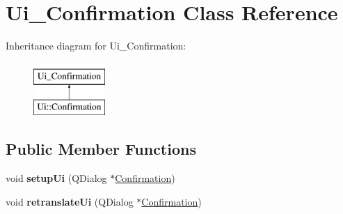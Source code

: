 \hypertarget{class_ui___confirmation}{\section{Ui\-\_\-\-Confirmation Class Reference}
\label{class_ui___confirmation}
}
Inheritance diagram for Ui\-\_\-\-Confirmation\-:\begin{figure}[H]
\begin{center}
\leavevmode
\includegraphics[height=2.000000cm]{class_ui___confirmation}
\end{center}
\end{figure}
\subsection*{Public Member Functions}
\begin{DoxyCompactItemize}
\item 
\hypertarget{class_ui___confirmation_a3e55f990e5b7f2a0622af658476a57ed}{void {\bfseries setup\-Ui} (Q\-Dialog $\ast$\hyperlink{class_confirmation}{Confirmation})}\label{class_ui___confirmation_a3e55f990e5b7f2a0622af658476a57ed}

\item 
\hypertarget{class_ui___confirmation_ac369e84875406ec499528cfb17ef6c58}{void {\bfseries retranslate\-Ui} (Q\-Dialog $\ast$\hyperlink{class_confirmation}{Confirmation})}\label{class_ui___confirmation_ac369e84875406ec499528cfb17ef6c58}

\end{DoxyCompactItemize}
